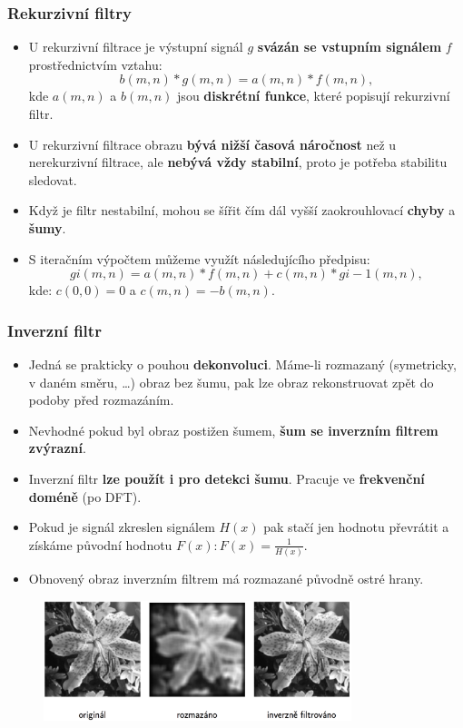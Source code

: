 \subsubsection{Rekurzivní filtry}
\begin{itemize}
\item U rekurzivní filtrace je výstupní signál $ g $ \textbf{svázán se vstupním signálem} $ f $ prostřednictvím vztahu:
\begin{equation*}
 b(m,n)*g(m,n)=a(m ,n)*f (m,n),
\end{equation*}
kde $ a(m,n) $ a $ b(m,n) $ jsou \textbf{diskrétní funkce}, které popisují rekurzivní filtr.
\item U rekurzivní filtrace obrazu \textbf{bývá nižší časová náročnost} než u nerekurzivní filtrace, ale \textbf{nebývá vždy stabilní}, proto je potřeba stabilitu sledovat. 
\item Když je filtr nestabilní, mohou se šířit čím dál vyšší zaokrouhlovací \textbf{chyby} a \textbf{šumy}.
\item S iteračním výpočtem můžeme využít následujícího předpisu:
\begin{equation*}
 gi (m,n)=a(m,n)*f (m ,n)+c(m,n)*gi−1 (m ,n),
\end{equation*}
kde: $ c (0,0)=0 $ a $ c (m ,n)=−b(m ,n) $.
\end{itemize}

\subsubsection{Inverzní filtr}
\begin{itemize}
\item Jedná se prakticky o pouhou \textbf{dekonvoluci}. Máme-li rozmazaný (symetricky, v daném směru, \ldots) obraz bez šumu, pak lze obraz rekonstruovat zpět do podoby před rozmazáním. 
\item Nevhodné pokud byl obraz postižen šumem, \textbf{šum se inverzním filtrem zvýrazní}.
\item Inverzní filtr \textbf{lze použít i pro detekci šumu}. Pracuje ve \textbf{frekvenční doméně} (po DFT).
\item Pokud je signál zkreslen signálem $ H(x) $ pak stačí jen hodnotu převrátit a získáme původní hodnotu $ F(x): F (x)= \frac{1}{H(x)} $.
\item Obnovený obraz inverzním filtrem má rozmazané původně ostré hrany.
\end{itemize}

\begin{figure}[H]
	\centering
	\includegraphics[width=0.8\textwidth]{assets/8_inv_filtr}
\end{figure}

